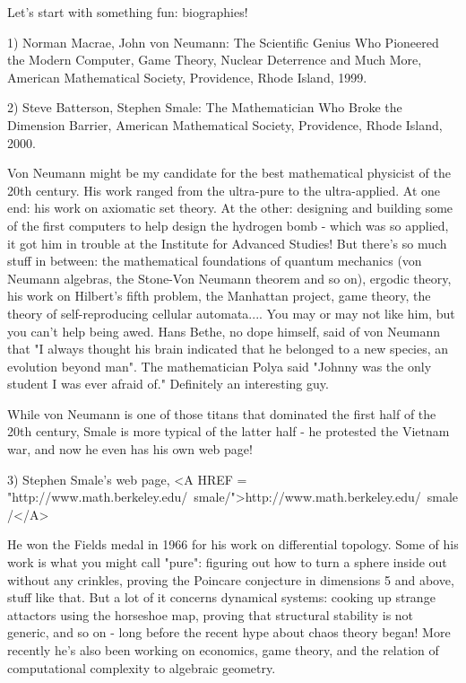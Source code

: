 

Let's start with something fun: biographies!  

1) Norman Macrae, John von Neumann: The Scientific Genius Who Pioneered
the Modern Computer, Game Theory, Nuclear Deterrence and Much More, 
American Mathematical Society, Providence, Rhode Island, 1999.  

2) Steve Batterson, Stephen Smale: The Mathematician Who Broke the
Dimension Barrier, American Mathematical Society, Providence, Rhode
Island, 2000.

Von Neumann might be my candidate for the best mathematical physicist of
the 20th century.  His work ranged from the ultra-pure to the
ultra-applied.  At one end: his work on axiomatic set theory.  At the
other: designing and building some of the first computers to help design
the hydrogen bomb - which was so applied, it got him in trouble at the
Institute for Advanced Studies!   But there's so much stuff in between:
the mathematical foundations of quantum mechanics (von Neumann algebras,
the Stone-Von Neumann theorem and so on), ergodic theory, his work on
Hilbert's fifth problem, the Manhattan project, game theory, the theory
of self-reproducing cellular automata....  You may or may not like him,
but you can't help being awed.  Hans Bethe, no dope himself, said of von
Neumann that "I always thought his brain indicated that he belonged to a
new species, an evolution beyond man".  The mathematician Polya said
"Johnny was the only student I was ever afraid of."  Definitely an
interesting guy.

While von Neumann is one of those titans that dominated the first 
half of the 20th century, Smale is more typical of the latter half -
he protested the Vietnam war, and now he even has his own web page!

3) Stephen Smale's web page, <A HREF = "http://www.math.berkeley.edu/~smale/">http://www.math.berkeley.edu/~smale/</A>

He won the Fields medal in 1966 for his work on differential topology.
Some of his work is what you might call "pure": figuring out how to 
turn a sphere inside out without any crinkles, proving the Poincare 
conjecture in dimensions 5 and above, stuff like that.  But a lot of it
concerns dynamical systems: cooking up strange attactors using  the
horseshoe map, proving that structural stability is not generic, and so
on - long before the recent hype about chaos theory began!  More
recently he's also been working on economics, game theory, and the
relation of computational complexity to algebraic geometry.  


